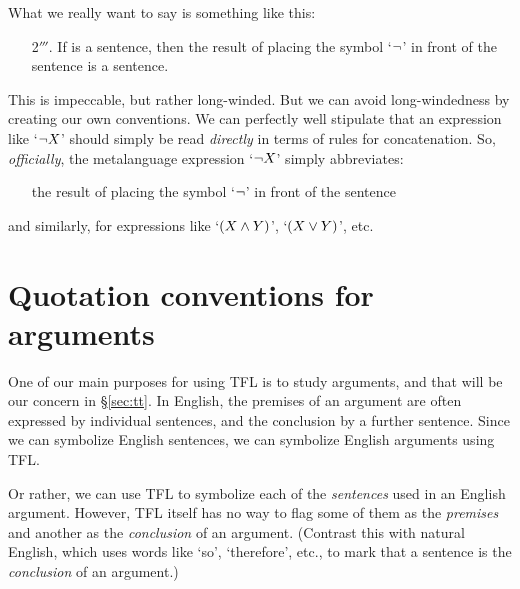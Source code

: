 What we really want to say is something like this:
	\begin{itemize}
		\item[2$'''$.] If \metaX is a sentence, then the result of placing the symbol `$\neg$' in front of the sentence \metaX is a sentence.
	\end{itemize}
	This is impeccable, but rather long-winded. %
But we can avoid long-windedness by creating our own conventions. We can perfectly well stipulate that an expression like `$\neg X$' should simply be read \emph{directly} in terms of rules for concatenation. So, \emph{officially}, the metalanguage expression `$\neg X$'
simply abbreviates:
\begin{itemize}
\item[]	the result of placing the symbol `$\neg$' in front of the sentence \metaX
\end{itemize}
and similarly, for expressions like `$(X \mathbin{\wedge} Y)$', `$(X \vee Y)$', etc.


\section{Quotation conventions for arguments}
One of our main purposes for using TFL is to study arguments, and that will be our concern in \S\ref{sec:tt}. In English, the premises of an argument are often expressed by individual sentences, and the conclusion by a further sentence. Since we can symbolize English sentences, we can symbolize English arguments using TFL.

Or rather, we can use TFL to symbolize each of the \emph{sentences} used in an English argument. However, TFL itself has no way to flag some of them as the \emph{premises} and another as the \emph{conclusion} of an argument.  (Contrast this with natural English, which uses words like `so', `therefore', etc., to mark that a sentence is the \emph{conclusion} of an argument.)

